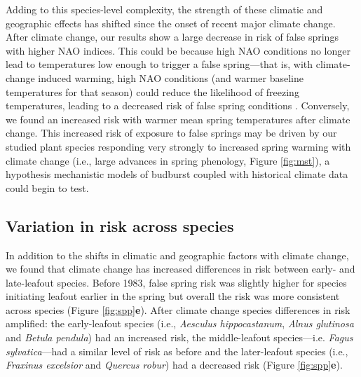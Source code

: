 \documentclass{article}\usepackage[]{graphicx}\usepackage[]{color}
\begin{document}
Adding to this species-level complexity, the strength of these climatic and geographic effects has shifted since the onset of recent major climate change. After climate change, our results show a large decrease in risk of false springs with higher NAO indices. This could be because high NAO conditions no longer lead to temperatures low enough to trigger a false spring---that is, with climate-change induced warming, high NAO conditions (and warmer baseline temperatures for that season) could reduce the likelihood of freezing temperatures, leading to a decreased risk of false spring conditions \citep{Screen2017}. Conversely, we found an increased risk with warmer mean spring temperatures after climate change. This increased risk of exposure to false springs may be driven by our studied plant species responding very strongly to increased spring warming with climate change (i.e., large advances in spring phenology, Figure \ref{fig:mst}), a hypothesis mechanistic models of budburst \citep{Chuine2016,Gauzere2017,Gauzere2019} coupled with historical climate data could begin to test.\\

\subsection*{Variation in risk across species} 
In addition to the shifts in climatic and geographic factors with climate change, we found that climate change has increased differences in risk between early- and late-leafout species. Before 1983, false spring risk was slightly higher for species initiating leafout earlier in the spring but overall the risk was more consistent across species (Figure \ref{fig:spp}\textbf{e}). After climate change species differences in risk amplified: the early-leafout species (i.e., \textit{Aesculus hippocastanum}, \textit{Alnus glutinosa} and \textit{Betula pendula}) had an increased risk, the middle-leafout species---i.e. \textit{Fagus sylvatica}---had a similar level of risk as before and the later-leafout species (i.e., \textit{Fraxinus excelsior} and \textit{Quercus robur}) had a decreased risk (Figure \ref{fig:spp}\textbf{e}). 
\end{document}
